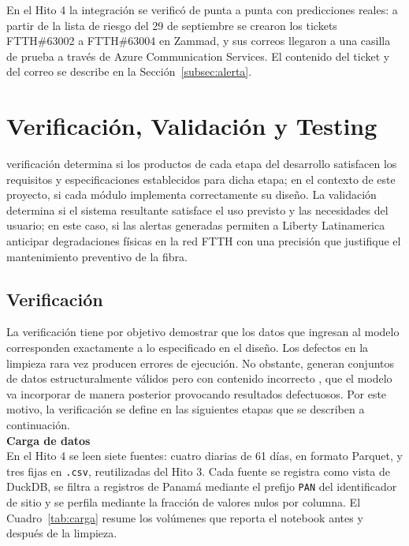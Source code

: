 \documentclass[12pt,a4paper]{article}
\begin{document}
En el Hito 4 la integración se verificó de punta a punta con predicciones reales: a partir de la lista de riesgo del 29 de septiembre se crearon los tickets FTTH\#63002 a FTTH\#63004 en Zammad, y sus correos llegaron a una casilla de prueba a través de Azure Communication Services. El contenido del ticket y del correo se describe en la Sección~\ref{subsec:alerta}.



\section{Verificación, Validación y Testing}
\label{sec:vvt}
\noindent
verificación determina si los productos de cada etapa del desarrollo satisfacen los requisitos y 
 especificaciones establecidos para dicha etapa; en el contexto de este proyecto, si cada módulo implementa
  correctamente su diseño. La validación determina si el sistema resultante satisface el uso previsto 
  y las necesidades del usuario; en este caso, si las alertas generadas permiten a Liberty Latinamerica anticipar
   degradaciones físicas en la red FTTH con una precisión que justifique el mantenimiento preventivo de la fibra.\\

\subsection{Verificación}
\label{subsec:verificacion}

\noindent
La verificación tiene por objetivo demostrar que los datos que ingresan al modelo corresponden exactamente
 a lo especificado en el diseño. Los defectos en la limpieza rara vez producen
  errores de ejecución. No obstante, generan conjuntos de datos estructuralmente válidos pero con contenido incorrecto
  , que el modelo va incorporar de manera posterior provocando resultados defectuosos. Por este motivo, la verificación se define en
   las siguientes etapas que se describen a
    continuación.\\
    \newline
\noindent
\textbf{Carga de datos } 
\\
En el Hito 4 se leen siete fuentes: cuatro diarias de 61 días, en formato Parquet, y tres fijas en \texttt{.csv}, reutilizadas del Hito 3. Cada fuente se registra como vista de DuckDB, se filtra a registros de Panamá mediante el prefijo \texttt{PAN} del identificador de sitio y se perfila mediante
la fracción de valores nulos por columna. El Cuadro~\ref{tab:carga} resume los volúmenes que reporta el notebook antes
y después de la limpieza.
\end{document}
